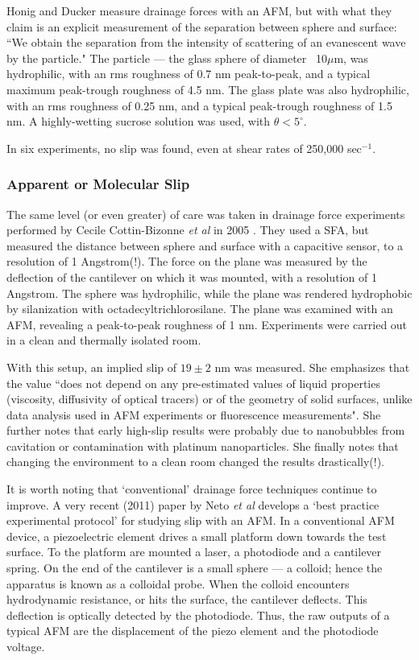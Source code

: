 \documentclass[12pt, a4paper, twoside, openright]{book}
\begin{document}
Honig and Ducker measure drainage forces with an AFM, but with what they claim is an explicit measurement of the separation between sphere and surface: ``We obtain the separation from the intensity of scattering of an evanescent wave by the particle." The particle --- the glass sphere of diameter ~10$\mu$m, was hydrophilic, with an rms roughness of 0.7 nm peak-to-peak, and a typical maximum peak-trough roughness of 4.5 nm. The glass plate was also hydrophilic, with an rms roughness of 0.25 nm, and a typical peak-trough roughness of 1.5 nm. A highly-wetting sucrose solution was used, with $\theta<5^{\circ}$.

In six experiments, no slip was found, even at shear rates of 250,000 sec$^{-1}$. 

\subsubsection{Apparent or Molecular Slip}

The same level (or even greater) of care was taken in drainage force experiments performed by Cecile Cottin-Bizonne \emph{et al} in 2005 \cite{Cottin-Bizonne2005}. They used a SFA, but measured the distance between sphere and surface with a capacitive sensor, to a resolution of 1 Angstrom(!). The force on the plane was measured by the deflection of the cantilever on which it was mounted, with a resolution of 1 Angstrom.  The sphere was hydrophilic, while the plane was rendered hydrophobic by silanization with octadecyltrichlorosilane. The plane was examined with an AFM, revealing a peak-to-peak roughness of 1 nm.  Experiments were carried out in a clean and thermally isolated room.

With this setup, an implied slip of $19 \pm 2$ nm was measured. She emphasizes that the value ``does not depend on any pre-estimated values of liquid properties (viscosity, diffusivity of optical tracers) or of the geometry of solid surfaces, unlike data analysis used in AFM experiments or fluorescence measurements".  She further notes that early high-slip results were probably due to nanobubbles from cavitation or contamination with platinum nanoparticles. She finally notes that changing the environment to a clean room changed the results drastically(!).

\vspace{1em}
It is worth noting that `conventional' drainage force techniques continue to improve.  A very recent (2011) paper by Neto \emph{et al} \cite{ZhuAttardNeto2011} develops a `best practice experimental protocol' for studying slip with an AFM.  In a conventional AFM device, a piezoelectric element drives a small platform down towards the test surface.  To the platform are mounted a laser, a photodiode and a cantilever spring.  On the end of the cantilever is a small sphere --- a colloid; hence the apparatus is known as a colloidal probe.  When the colloid encounters hydrodynamic resistance, or hits the surface, the cantilever deflects.  This deflection is optically detected by the photodiode. Thus, the raw outputs of a typical AFM are the displacement of the piezo element and the photodiode voltage.
\end{document}
